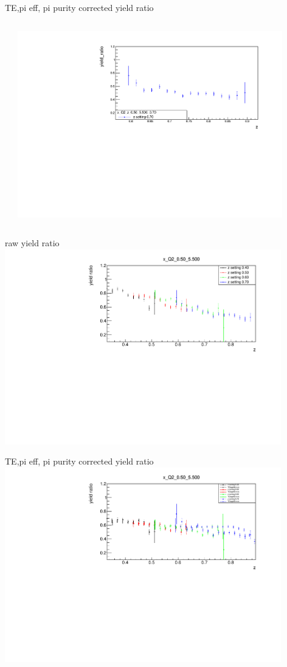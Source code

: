 \begin{frame}{TE,pi eff, pi purity corrected yield ratio}
\begin{columns}
\begin{column}[T]{0.5\textwidth}
\end{column}
\begin{column}[T]{0.5\textwidth}
\includegraphics[width = 0.9\textwidth]{results/yield/statistics_corr/x_Q2_z_0.50_5.500_0.70_ratio.pdf}
\end{column}
\end{columns}
\end{frame}
\begin{frame}{raw yield ratio}
\includegraphics[width = 0.9\textwidth]{results/yield/statistics/x_Q2_0.50_5.500_ratio.pdf}
\end{frame}
\begin{frame}{TE,pi eff, pi purity corrected yield ratio}
\includegraphics[width = 0.9\textwidth]{results/yield/statistics_corr/x_Q2_0.50_5.500_ratio.pdf}
\end{frame}
